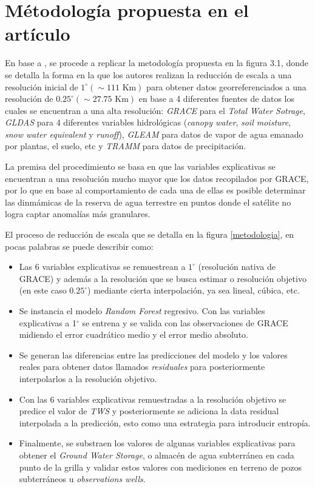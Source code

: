\section{Métodología propuesta en el artículo}
En base a \cite{11}, se procede a replicar la metodología propuesta en la figura 3.1, donde se detalla
la forma en la que los autores realizan la reducción de escala a una resolución inicial de $1^{\circ} (\sim 111 \text{ Km})$
para obtener datos georreferenciados a una resolución de $0.25^{\circ} (\sim 27.75 \text{ Km})$ en base a 4 diferentes fuentes de datos los cuales se encuentran a una alta resolución: 
\textit{GRACE} para el \textit{Total Water Sotrage}, \textit{GLDAS} para 4 diferentes variables hidrológicas (\textit{canopy water}, \textit{soil moisture}, 
\textit{snow water equivalent} y \textit{runoff}), \textit{GLEAM} para datos 
de vapor de agua emanado por plantas, el suelo, etc y \textit{TRAMM} para datos de precipitación.

La premisa del procedimiento se basa en que las variables explicativas se encuentran a una resolución mucho mayor que los datos recopilados por GRACE,
por lo que en base al comportamiento de cada una de ellas es posible determinar las dinmámicas de la reserva de agua terrestre en puntos donde el satélite no 
logra captar anomalías más granulares.

El proceso de reducción de escala que se detalla en la figura \ref{metodologia}, en pocas palabras se puede describir
como:
\begin{itemize}

    \item Las 6 variables explicativas se remuestrean a $1^{\circ}$ (resolución 
    nativa de GRACE) y además a la resolución que se busca estimar o resolución objetivo (en este caso $0.25^{\circ}$) mediante 
    cierta interpolación, ya sea lineal, cúbica, etc.

    \item Se instancia el modelo \textit{Random Forest} regresivo. Con las variables explicativas a 1$^{\circ}$ se entrena y se valida
    con las observaciones de GRACE midiendo el error cuadrático medio y el error medio absoluto.
    
    \item Se generan las diferencias entre las predicciones del modelo y los valores reales para obtener
    datos llamados \textit{residuales} para posteriormente interpolarlos a la resolución objetivo.

    \item Con las 6 variables explicativas remuestradas a la resolución objetivo se predice el valor de \textit{TWS}
    y posteriormente se adiciona la data residual interpolada a la predicción, esto como una estrategia para introducir entropía.
    
    \item Finalmente, se substraen los valores de algunas variables explicativas para obtener el 
    \textit{Ground Water Storage}, o almacén de agua subterránea en cada punto de la grilla y validar estos valores con
    mediciones en terreno de pozos subterráneos u \textit{observations wells}.
    
\end{itemize}

